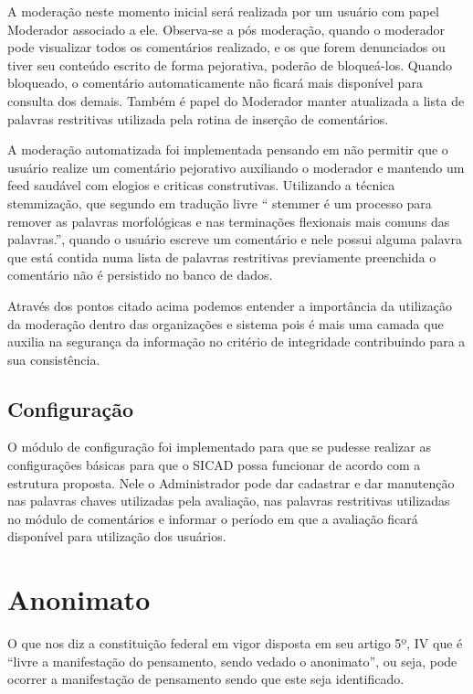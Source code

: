 \documentclass[12pt, a4paper]{report}
\begin{document}
A moderação neste momento inicial será realizada por um usuário com papel Moderador associado a ele. Observa-se a pós moderação, quando o moderador pode visualizar todos os comentários realizado, e os que forem denunciados ou tiver seu conteúdo escrito de forma pejorativa, poderão de bloqueá-los. Quando bloqueado, o comentário automaticamente não ficará mais disponível para consulta dos demais. Também é papel do Moderador manter atualizada a lista de palavras restritivas utilizada pela rotina de inserção de comentários. 


A moderação automatizada foi implementada pensando em não permitir que o usuário realize um comentário pejorativo auxiliando o moderador e mantendo um feed saudável com elogios e criticas construtivas. Utilizando a técnica stemmização, que segundo \cite{porter1980} em tradução livre “ stemmer é um processo para remover as palavras morfológicas e nas terminações flexionais mais comuns das palavras.”, quando o usuário escreve um comentário e nele possui alguma palavra que está contida numa lista de palavras restritivas previamente preenchida o comentário não é persistido no banco de dados.  

Através dos pontos citado acima podemos entender a importância da utilização da moderação dentro das organizações e sistema pois é  mais uma camada que auxilia na segurança da informação no critério de integridade contribuindo para a sua consistência.

\subsection{Configuração}
O módulo de configuração foi implementado para que se pudesse realizar as configurações básicas para que o SICAD possa funcionar de acordo com a estrutura proposta. Nele o Administrador pode dar cadastrar e dar manutenção nas palavras chaves utilizadas pela avaliação, nas palavras restritivas utilizadas no módulo de comentários e informar o período em que a avaliação ficará disponível para utilização dos usuários.

\section{ Anonimato}

O que nos diz a constituição federal em vigor disposta em seu artigo 5º, IV que é “livre a manifestação do pensamento, sendo vedado o anonimato”, ou seja, pode ocorrer a manifestação de pensamento sendo que este seja identificado.  
\end{document}
